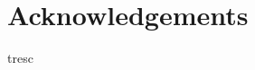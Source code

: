 \chapter*{Acknowledgements}

\thispagestyle{empty}

 \label{sec:acknowledgements}
	
	tresc

\newpage
\thispagestyle{empty}
\mbox{}